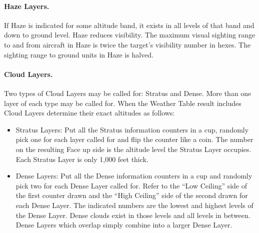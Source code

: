 
\paragraph{Haze Layers.} If Haze is indicated for some altitude band, it exists in all levels of that band and down to ground level. Haze reduces visibility. The maximum visual sighting range to and from aircraft in Haze is twice the target's visibility number in hexes. The sighting range to ground units in Haze is halved.

\paragraph{Cloud Layers.} Two types of Cloud Layers may be called for: Stratus and Dense. More than one layer of each type may be called for. When the Weather Table result includes Cloud Layers determine their exact altitudes as follows:

\begin{itemize}
    \item Stratus Layers: Put all the Stratus information counters in a cup, randomly pick one for each layer called for and flip the counter like a coin. The number on the resulting Face up side is the altitude level the Stratus Layer occupies. Each Stratus Layer is only 1,000 feet thick.

    \item Dense Layers: Put all the Dense information counters in a cup and randomly pick two for each Dense Layer called for. Refer to the “Low Ceiling” side of the first counter drawn and the “High Ceiling” side of the second drawn for each Dense Layer. The indicated numbers are the lowest and highest levels of the Dense Layer. Dense clouds exist in those levels and all levels in between. Dense Layers which overlap simply combine into a larger Dense Layer.
\end{itemize}



